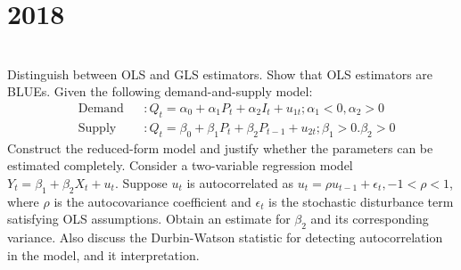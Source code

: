 \section*{2018}
\vspace{-.5cm}
\hrulefill \smallskip\\
 Distinguish between OLS and GLS estimators. Show that OLS estimators are BLUEs.
\myline
{} Given the following demand-and-supply model:
\[    \begin{alignat}{2}
        &\text{Demand} &&: Q_t = \alpha_0 + \alpha_1P_t + \alpha_2I_t + u_{1t};\alpha_1 <0, \alpha_2>0 \\
        &\text{Supply} &&: Q_t = \beta_0 + \beta_1P_t + \beta_2P_{t-1} +u_{2t}; \beta_1 >0. \beta_2 >0
    \end{alignat} \] Construct the reduced-form model and justify whether the parameters can be estimated completely.
    \myline
     Consider a two-variable regression model $Y_t = \beta_1 + \beta_2X_t + u_t$. Suppose $u_t$ is autocorrelated as $u_t = \rho u_{t-1} + \epsilon_t,-1 < \rho < 1$, where $\rho$ is the autocovariance coefficient and $\epsilon_t$ is the stochastic disturbance term satisfying OLS assumptions. Obtain an estimate for $\beta_2$ and its corresponding variance. Also discuss the Durbin-Watson statistic for detecting autocorrelation in the model, and it interpretation. 
